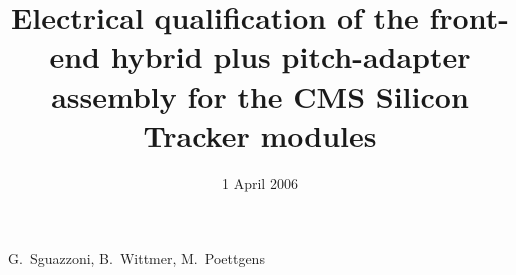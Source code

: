 \documentclass{cmspaperpdf}
\begin{document}

\begin{titlepage}


   \date{1 April 2006}

  \title{Electrical qualification of the front-end hybrid plus
  pitch-adapter assembly for the CMS Silicon Tracker modules} 

  \begin{Authlist}
    G.~Sguazzoni, B.~Wittmer,
    M.~Poettgens
  \end{Authlist}


  

\end{titlepage}

\setcounter{page}{2}












 

 

%
\end{document}
